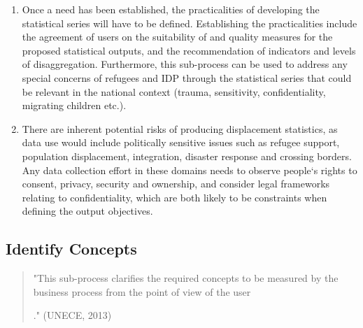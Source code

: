 \documentclass[
]{article}
\begin{document}
\begin{enumerate}
\def\labelenumi{\arabic{enumi}.}
\setcounter{enumi}{47}
\item
  Once a need has been established, the practicalities of developing
  the statistical series will have to be defined. Establishing the
  practicalities include the agreement of users on the suitability of
  and quality measures for the proposed statistical outputs, and the
  recommendation of indicators and levels of disaggregation.
  Furthermore, this sub-process can be used to address any special
  concerns of refugees and IDP through the statistical series that
  could be relevant in the national context (trauma, sensitivity,
  confidentiality, migrating children etc.).
\item
  There are inherent potential risks of producing displacement
  statistics, as data use would include politically sensitive issues
  such as refugee support, population displacement, integration,
  disaster response and crossing borders. Any data collection effort
  in these domains needs to observe people`s rights to consent,
  privacy, security and ownership, and consider legal frameworks
  relating to confidentiality, which are both likely to be constraints
  when defining the output objectives.
\end{enumerate}

\hypertarget{identify-concepts}{%
\subsection{Identify Concepts}\label{identify-concepts}}

\begin{quote}
"This sub-process clarifies the required concepts to be measured by
the business process from the point of view of the user

." (UNECE, 2013)
\end{quote}
\end{document}
